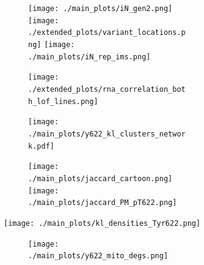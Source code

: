 \begin{figure}[H]
    
    \begin{subfigure}[t]{.24\textwidth}
        \begin{subfigure}[t]{\textwidth}
            \caption{}
            \texttt{[image: ./main\_plots/iN\_gen2.png]}        
            \texttt{[image: ./extended\_plots/variant\_locations.png]}        
            \texttt{[image: ./main\_plots/iN\_rep\_ims.png]}        
        \end{subfigure} 
        \begin{subfigure}[t]{\textwidth}
            \caption{}
            \texttt{[image: ./extended\_plots/rna\_correlation\_both\_lof\_lines.png]}        
        \end{subfigure} 
    \end{subfigure} 
    \hspace{.5cm}
    \begin{subfigure}[t]{.23\textwidth}
        \begin{subfigure}[t]{\textwidth}
            \caption{}
            \texttt{[image: ./main\_plots/y622\_kl\_clusters\_network.pdf]}        
        \end{subfigure}
        \begin{subfigure}[t]{\textwidth}
            \caption{}
            \centering
            \texttt{[image: ./main\_plots/jaccard\_cartoon.png]}        
            \texttt{[image: ./main\_plots/jaccard\_PM\_pT622.png]}        
        \end{subfigure}  
    \end{subfigure} 
    \hspace{.25cm}
    \begin{subfigure}[t]{.45\textwidth}
        \caption{}
        \texttt{[image: ./main\_plots/kl\_densities\_Tyr622.png]}        
    \end{subfigure}  
    \vspace{.25cm}
    \begin{subfigure}[t]{.25\textwidth}
        \begin{subfigure}[t]{\textwidth}
            \caption{}
            \texttt{[image: ./main\_plots/y622\_mito\_degs.png]}        
        \end{subfigure}  
    \end{subfigure} 
    \begin{subfigure}[t]{.2\textwidth}
        \caption{}

\end{subfigure}
\end{figure}
